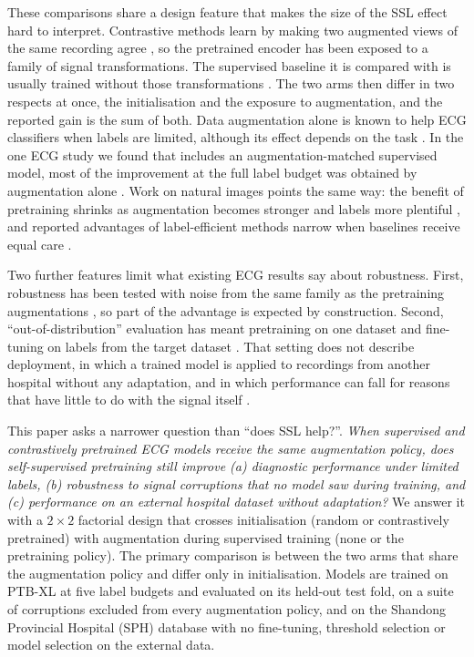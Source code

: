 \documentclass[preprint,12pt]{elsarticle}
\begin{document}
These comparisons share a design feature that makes the size of the SSL effect hard to interpret. Contrastive methods learn by making two augmented views of the same recording agree \cite{chen2020simclr}, so the pretrained encoder has been exposed to a family of signal transformations. The supervised baseline it is compared with is usually trained without those transformations \cite{mehari2022,soltanieh2024ood,weimann2025}. The two arms then differ in two respects at once, the initialisation and the exposure to augmentation, and the reported gain is the sum of both. Data augmentation alone is known to help ECG classifiers when labels are limited, although its effect depends on the task \cite{raghu2022}. In the one ECG study we found that includes an augmentation-matched supervised model, most of the improvement at the full label budget was obtained by augmentation alone \cite{lai2023}. Work on natural images points the same way: the benefit of pretraining shrinks as augmentation becomes stronger and labels more plentiful \cite{zoph2020}, and reported advantages of label-efficient methods narrow when baselines receive equal care \cite{oliver2018}.

Two further features limit what existing ECG results say about robustness. First, robustness has been tested with noise from the same family as the pretraining augmentations \cite{mehari2022}, so part of the advantage is expected by construction. Second, ``out-of-distribution'' evaluation has meant pretraining on one dataset and fine-tuning on labels from the target dataset \cite{soltanieh2024ood}. That setting does not describe deployment, in which a trained model is applied to recordings from another hospital without any adaptation, and in which performance can fall for reasons that have little to do with the signal itself \cite{zech2018,leinonen2024}.

This paper asks a narrower question than ``does SSL help?''. \emph{When supervised and contrastively pretrained ECG models receive the same augmentation policy, does self-supervised pretraining still improve (a) diagnostic performance under limited labels, (b) robustness to signal corruptions that no model saw during training, and (c) performance on an external hospital dataset without adaptation?} We answer it with a $2\times2$ factorial design that crosses initialisation (random or contrastively pretrained) with augmentation during supervised training (none or the pretraining policy). The primary comparison is between the two arms that share the augmentation policy and differ only in initialisation. Models are trained on PTB-XL \cite{wagner2020} at five label budgets and evaluated on its held-out test fold, on a suite of corruptions excluded from every augmentation policy, and on the Shandong Provincial Hospital (SPH) database \cite{liu2022sph} with no fine-tuning, threshold selection or model selection on the external data.
\end{document}
